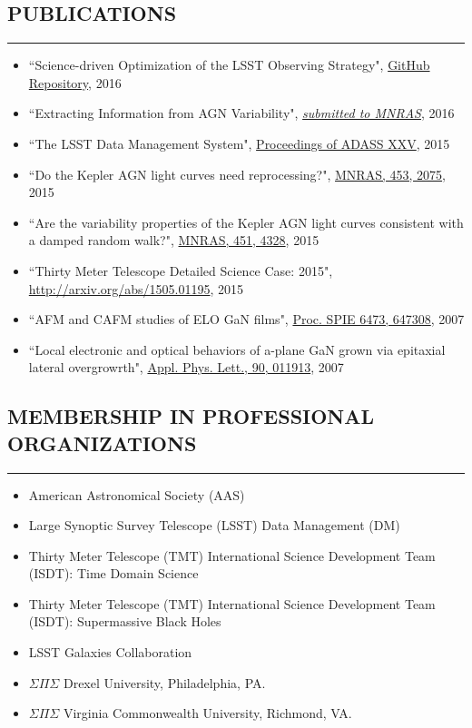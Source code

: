 \documentclass[10pt,a4]{article}
\newcounter{mySaveCounter}
\newcommand\myEnumReset{\setcounter{mySaveCounter}{0}}
\begin{document}
\subsection*{PUBLICATIONS}
\hrule  height 4pt
\vspace{0.2cm}
\begin{itemize}
  \item ``Science-driven Optimization of the LSST Observing Strategy", \href{https://github.com/LSSTScienceCollaborations/ObservingStrategy}{GitHub Repository}, 2016
	\item ``Extracting Information from AGN Variability", \href{https://arxiv.org/abs/1607.04299}{\textit{submitted to MNRAS}}, 2016
	\item ``The LSST Data Management System", \href{http://adsabs.harvard.edu/cgi-bin/bib_query?arXiv:1512.07914}{Proceedings of ADASS XXV}, 2015
	\item ``Do the Kepler AGN light curves need reprocessing?", \href{http://dx.doi.org/10.1093/mnras/stv1797}{MNRAS, 453, 2075}, 2015
	\item ``Are the variability properties of the Kepler AGN light curves consistent with a damped random walk?", \href{http://dx.doi.org/ 10.1093/mnras/stv1230}{MNRAS, 451, 4328}, 2015
	\item  ``Thirty Meter Telescope Detailed Science Case: 2015", \href{http://arxiv.org/abs/1505.01195}{http://arxiv.org/abs/1505.01195}, 2015
	\item  ``AFM and CAFM studies of ELO GaN films", \href{http://dx.doi.org/10.1117/12.706773}{Proc. SPIE 6473, 647308}, 2007
	\item ``Local electronic and optical behaviors of a-plane GaN grown via epitaxial lateral overgrowrth", \href{http://dx.doi.org/10.1063/1.2429901}{Appl. Phys. Lett., 90, 011913}, 2007
\end{itemize}
\myEnumReset

\subsection*{MEMBERSHIP IN PROFESSIONAL ORGANIZATIONS}
\hrule  height 4pt
\vspace{0.2cm}
\begin{itemize}
	\item American Astronomical Society (AAS)
	\item Large Synoptic Survey Telescope (LSST) Data Management (DM)
	\item Thirty Meter Telescope (TMT) International Science Development Team (ISDT): Time Domain Science
	\item Thirty Meter Telescope (TMT) International Science Development Team (ISDT): Supermassive Black Holes
  \item LSST Galaxies Collaboration
	\item $\Sigma \Pi \Sigma$ Drexel University, Philadelphia, PA.
	\item $\Sigma \Pi \Sigma$ Virginia Commonwealth University, Richmond, VA.
\end{itemize}
\myEnumReset
\end{document}
